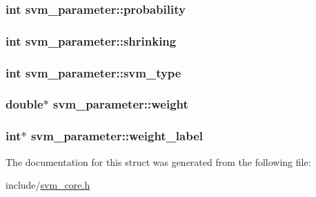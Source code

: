 \subsubsection[{probability}]{\setlength{\rightskip}{0pt plus 5cm}int svm\+\_\+parameter\+::probability}\hypertarget{structsvm__parameter_afac0ef02879d7e27e17ac2a75115a7d9}{}\label{structsvm__parameter_afac0ef02879d7e27e17ac2a75115a7d9}
\subsubsection[{shrinking}]{\setlength{\rightskip}{0pt plus 5cm}int svm\+\_\+parameter\+::shrinking}\hypertarget{structsvm__parameter_afdbccdf6a24be650d75804b783edc347}{}\label{structsvm__parameter_afdbccdf6a24be650d75804b783edc347}
\subsubsection[{svm\+\_\+type}]{\setlength{\rightskip}{0pt plus 5cm}int svm\+\_\+parameter\+::svm\+\_\+type}\hypertarget{structsvm__parameter_a3afb37272180a903df05f7b649b338f4}{}\label{structsvm__parameter_a3afb37272180a903df05f7b649b338f4}
\subsubsection[{weight}]{\setlength{\rightskip}{0pt plus 5cm}double$\ast$ svm\+\_\+parameter\+::weight}\hypertarget{structsvm__parameter_afff750f99180b5ddf735404496b6c196}{}\label{structsvm__parameter_afff750f99180b5ddf735404496b6c196}
\subsubsection[{weight\+\_\+label}]{\setlength{\rightskip}{0pt plus 5cm}int$\ast$ svm\+\_\+parameter\+::weight\+\_\+label}\hypertarget{structsvm__parameter_a06753922bb0282240f35ae7683f8d69a}{}\label{structsvm__parameter_a06753922bb0282240f35ae7683f8d69a}


The documentation for this struct was generated from the following file\+:\begin{DoxyCompactItemize}
\item 
include/\hyperlink{svm__core_8h}{svm\+\_\+core.\+h}\end{DoxyCompactItemize}
